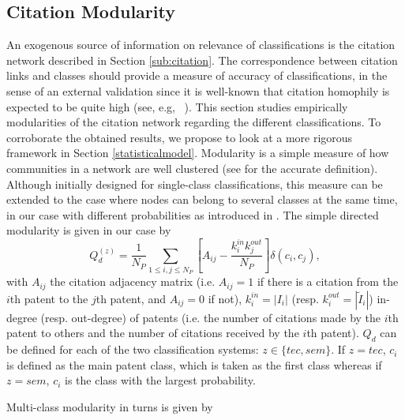 \documentclass[10pt,A4,draft]{article}
\begin{document}
\subsection{Citation Modularity}
\label{citationmodularity}

An exogenous source of information on relevance of classifications is the citation network described in Section \ref{sub:citation}. The correspondence between citation links and classes should provide a measure of accuracy of classifications, in the sense of an external validation since it is well-known that citation homophily  is expected to be quite high (see, e.g, ~\cite{AAKnetwork2016}). This section studies empirically modularities of the citation network regarding the different classifications. To corroborate the obtained results, we propose to look at a more rigorous framework in Section \ref{statisticalmodel}. Modularity is a simple measure of how communities in a network are well clustered (see \cite{clauset2004finding} for the accurate definition). Although initially designed for single-class classifications, this measure can be extended to the case where nodes can belong to several classes at the same time, in our case with different probabilities as introduced in \cite{nicosia2009extending}. The simple directed modularity is given in our case by
\[
Q_d^{(z)} = \displaystyle \frac{1}{N_P}\sum_{1\leq i,j\leq N_P}\left[A_{ij} - \frac{k_{i}^{in}k_{j}^{out}}{N_P}\right]\delta(c_i,c_j),
\]
with $A_{ij}$ the citation adjacency matrix (i.e. $A_{ij} = 1$ if there is a citation from the $i$th patent to the $j$th patent, and $A_{ij}=0$ if not), $k_i^{in}=\left| I_i\right|$ (resp. $k_i^{out}= \left|\tilde{I}_i \right|$) in-degree (resp. out-degree) of patents (i.e. the number of citations made by the $i$th patent to others and the number of citations received by the $i$th patent). $Q_d$ can be defined for each of the two classification systems: $z \in \{tec, sem\}$. If $z=tec$, $c_i$ is defined as the main patent class, which is taken as the first class whereas if $z=sem$, $c_i$ is the class with the largest probability.

Multi-class modularity in turns is given by
\end{document}
